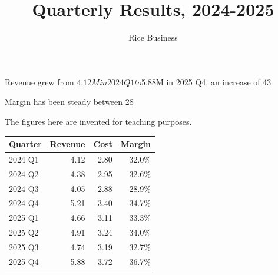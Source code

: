 \documentclass[11pt]{article}
\title{Quarterly Results, 2024-2025}
\author{Rice Business}
\date{}
\begin{document}
\maketitle

Revenue grew from $4.12M in 2024 Q1 to $5.88M in 2025 Q4, an increase of 43%

Margin has been steady between 28%

The figures here are invented for teaching purposes.

\begin{center}
\begin{tabular}{lrrr}
\toprule
Quarter & Revenue & Cost & Margin \\
\midrule
2024 Q1 & 4.12 & 2.80 & 32.0\% \\
2024 Q2 & 4.38 & 2.95 & 32.6\% \\
2024 Q3 & 4.05 & 2.88 & 28.9\% \\
2024 Q4 & 5.21 & 3.40 & 34.7\% \\
2025 Q1 & 4.66 & 3.11 & 33.3\% \\
2025 Q2 & 4.91 & 3.24 & 34.0\% \\
2025 Q3 & 4.74 & 3.19 & 32.7\% \\
2025 Q4 & 5.88 & 3.72 & 36.7\% \\
\bottomrule
\end{tabular}
\end{center}
\end{document}
